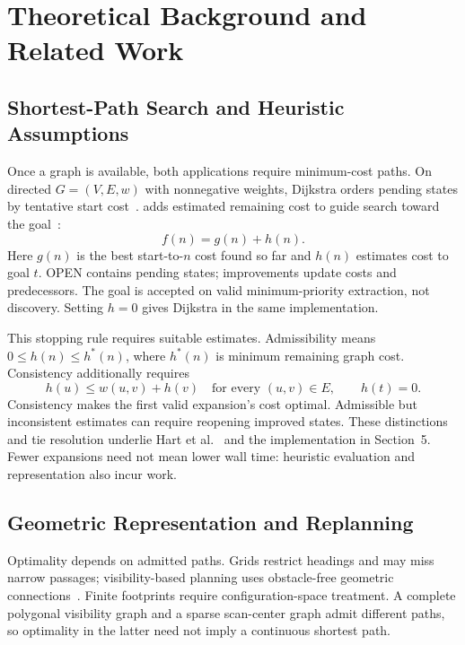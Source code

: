 \section{Theoretical Background and Related Work}
\subsection{Shortest-Path Search and Heuristic Assumptions}
Once a graph is available, both applications require minimum-cost paths. On directed $G=(V,E,w)$ with nonnegative weights, Dijkstra orders pending states by tentative start cost~\cite{dijkstra1959}. \astar{} adds estimated remaining cost to guide search toward the goal~\cite{hart1968}:
\begin{equation}f(n)=g(n)+h(n).
\end{equation}
Here $g(n)$ is the best start-to-$n$ cost found so far and $h(n)$ estimates cost to goal $t$. OPEN contains pending states; improvements update costs and predecessors. The goal is accepted on valid minimum-priority extraction, not discovery. Setting $h=0$ gives Dijkstra in the same implementation.

This stopping rule requires suitable estimates. Admissibility means $0\leq h(n)\leq h^*(n)$, where $h^*(n)$ is minimum remaining graph cost. Consistency additionally requires
\begin{equation}
h(u)\leq w(u,v)+h(v)\quad\text{for every }(u,v)\in E,\qquad h(t)=0.
\label{eq:consistency}
\end{equation}
Consistency makes the first valid expansion's cost optimal. Admissible but inconsistent estimates can require reopening improved states. These distinctions and tie resolution underlie Hart et al.~\cite{hart1968} and the implementation in Section~5. Fewer expansions need not mean lower wall time: heuristic evaluation and representation also incur work.

\subsection{Geometric Representation and Replanning}
Optimality depends on admitted paths. Grids restrict headings and may miss narrow passages; visibility-based planning uses obstacle-free geometric connections~\cite{lozano1979}. Finite footprints require configuration-space treatment. A complete polygonal visibility graph and a sparse scan-center graph admit different paths, so optimality in the latter need not imply a continuous shortest path.


